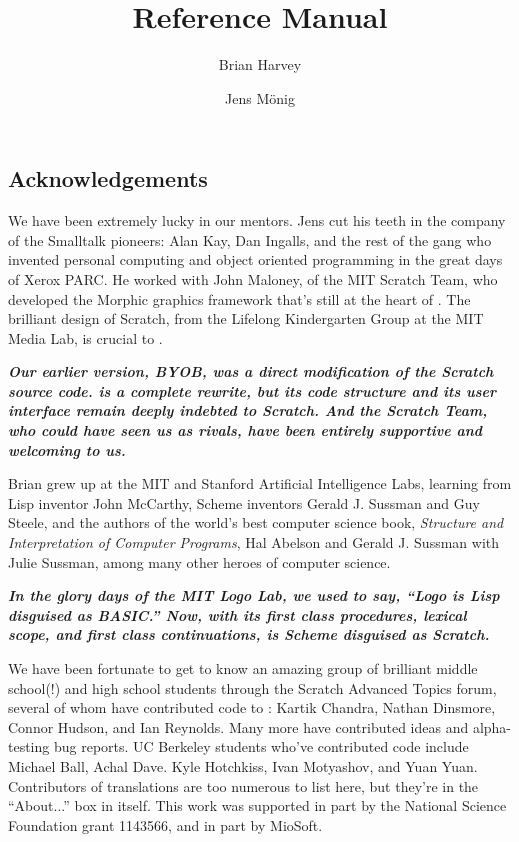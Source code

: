 \documentclass{report}
\begin{document}
\title{\Snap{} Reference Manual}
\author{Brian Harvey \and Jens M\"{o}nig}
\date{}

\maketitle

\tableofcontents

\chapter*{}
\section*{Acknowledgements}

We have been extremely lucky in our mentors. Jens cut his teeth in the company of the Smalltalk pioneers: Alan Kay, Dan Ingalls, and the rest of the gang who invented personal computing and object oriented programming in the great days of Xerox PARC. He worked with John Maloney, of the MIT Scratch Team, who developed the Morphic graphics framework that's still at the heart of \Snap{}. The brilliant design of Scratch, from the Lifelong Kindergarten Group at the MIT Media Lab, is crucial to \Snap{}.

{\bf\em Our earlier version, BYOB, was a direct modification of the Scratch source code. \Snap{} is a complete rewrite, but its code structure and its user interface remain deeply indebted to Scratch. And the Scratch Team, who could have seen us as rivals, have been entirely supportive and welcoming to us.}

Brian grew up at the MIT and Stanford Artificial Intelligence Labs, learning from Lisp inventor John McCarthy, Scheme inventors Gerald J. Sussman and Guy Steele, and the authors of the world's best computer science book, \emph{Structure and Interpretation of Computer Programs}, Hal Abelson and Gerald J. Sussman with Julie Sussman, among many other heroes of computer science.

{\bf\em In the glory days of the MIT Logo Lab, we used to say, ``Logo is Lisp disguised as BASIC.'' Now, with its first class procedures, lexical scope, and first class continuations, \Snap{} is Scheme disguised as Scratch.}

We have been fortunate to get to know an amazing group of brilliant middle school(!) and high school students through the Scratch Advanced Topics forum, several of whom have contributed code to \Snap{}: Kartik Chandra, Nathan Dinsmore, Connor Hudson, and Ian Reynolds. Many more have contributed ideas and alpha-testing bug reports. UC Berkeley students who've contributed code include Michael Ball, Achal Dave. Kyle Hotchkiss, Ivan Motyashov, and Yuan Yuan. Contributors of translations are too numerous to list here, but they're in the ``About...'' box in \Snap{} itself. This work was supported in part by the National Science Foundation grant 1143566, and in part by MioSoft.
\end{document}
